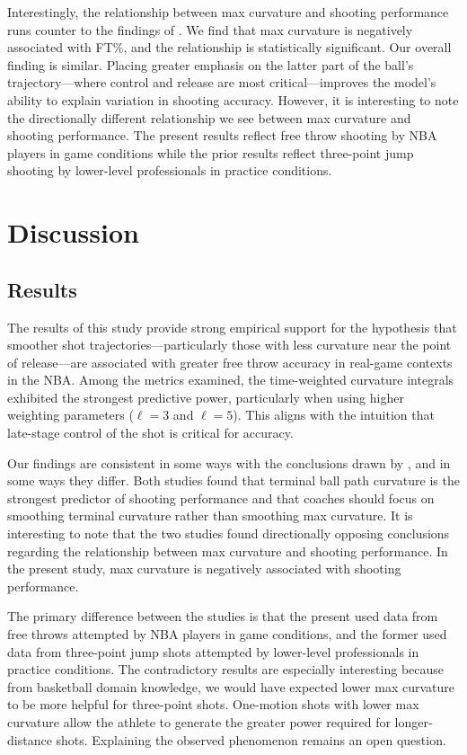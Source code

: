 \documentclass{article}
\begin{document}
    Interestingly, the relationship between max curvature and shooting performance runs counter to the findings of \citet{slegers_role_2024}. We find that max curvature is negatively associated with FT\%, and the relationship is statistically significant. Our overall finding is similar. Placing greater emphasis on the latter part of the ball's trajectory---where control and release are most critical---improves the model's ability to explain variation in shooting accuracy. However, it is interesting to note the directionally different relationship we see between max curvature and shooting performance. The present results reflect free throw shooting by NBA players in game conditions while the prior results reflect three-point jump shooting by lower-level professionals in practice conditions.

\section{Discussion}

    \subsection{Results}
      
      The results of this study provide strong empirical support for the hypothesis that smoother shot trajectories---particularly those with less curvature near the point of release---are associated with greater free throw accuracy in real-game contexts in the NBA. Among the metrics examined, the time-weighted curvature integrals exhibited the strongest predictive power, particularly when using higher weighting parameters (\(\ell=3\) and \(\ell=5\)). This aligns with the intuition that late-stage control of the shot is critical for accuracy.
      
      Our findings are consistent in some ways with the conclusions drawn by \citet{slegers_role_2024}, and in some ways they differ. Both studies found that terminal ball path curvature is the strongest predictor of shooting performance and that coaches should focus on smoothing terminal curvature rather than smoothing max curvature. It is interesting to note that the two studies found directionally opposing conclusions regarding the relationship between max curvature and shooting performance. In the present study, max curvature is negatively associated with shooting performance.

      The primary difference between the studies is that the present used data from free throws attempted by NBA players in game conditions, and the former used data from three-point jump shots attempted by lower-level professionals in practice conditions. The contradictory results are especially interesting because from basketball domain knowledge, we would have expected lower max curvature to be more helpful for three-point shots. One-motion shots with lower max curvature allow the athlete to generate the greater power required for longer-distance shots. Explaining the observed phenomenon remains an open question. 
      
\end{document}
